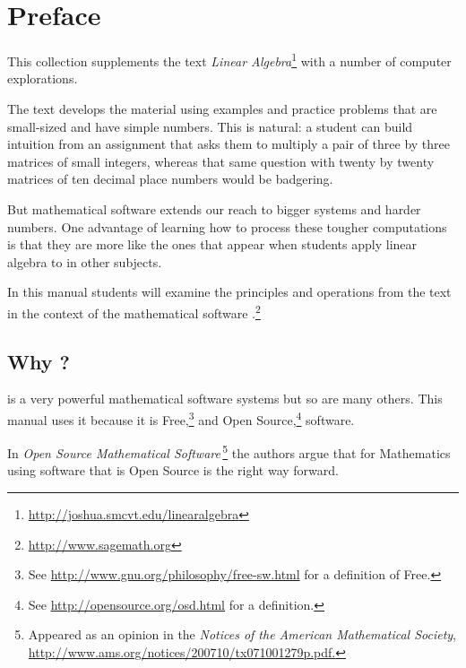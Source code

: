 \chapter*{Preface}\pagestyle{preface}\thispagestyle{preface}


This collection supplements the text
\textit{Linear Algebra}\footnote{\protect\url{http://joshua.smcvt.edu/linearalgebra}}
with a number of computer explorations.

The text develops the material using examples and practice problems
that are small-sized and have simple numbers.
This is natural: a student can build intuition from an assignment 
that asks them to multiply a pair of 
three by three matrices of small integers, whereas that same 
question with twenty by twenty matrices
of ten decimal place numbers would be badgering. 

But mathematical software extends our reach to bigger systems and
harder numbers.
One advantage of learning how to process these tougher computations is that 
they are more like the ones that appear when students apply linear 
algebra to in other subjects.

In this manual students will examine the principles and operations 
from the text in the context
of the mathematical software \sage{}.\footnote{\url{http://www.sagemath.org}}


\section{Why \sage?}
\sage{} is a very powerful mathematical software systems but so are
many others.
This manual uses it because it is 
Free,\footnote{See \protect\url{http://www.gnu.org/philosophy/free-sw.html} for a definition of Free.} 
and Open Source,\footnote{See \protect\url{http://opensource.org/osd.html} for a definition.} software.

In 
\textit{Open Source Mathematical Software\,}\footnote{Appeared as an opinion in the \protect\textit{Notices of the American Mathematical Society}, \protect\url{http://www.ams.org/notices/200710/tx071001279p.pdf.}}
the authors argue that for Mathematics using software that is Open Source
is the right way forward.

